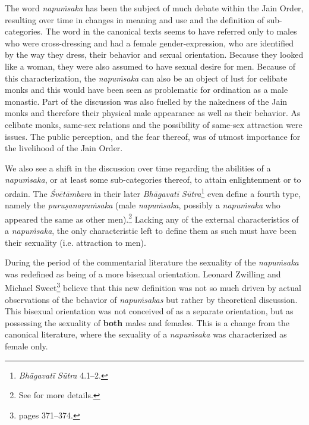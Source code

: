 The word \textit{napuṁsaka} has been the subject of much debate within the Jain Order, resulting over time in changes in meaning and use and the definition of sub-categories. The word in the canonical texts seems to have referred only to males who were cross-dressing and had a female gender-expression, who are identified by the way they dress, their behavior and sexual orientation. Because they looked like a woman, they were also assumed to have sexual desire for men. Because of this characterization, the \textit{napuṁsaka} can also be an object of lust for celibate monks and this would have been seen as problematic for ordination as a male monastic. Part of the discussion was also fuelled by the nakedness of the Jain monks and therefore their physical male appearance as well as their behavior. As celibate monks, same-sex relations and the possibility of same-sex attraction were issues. The public perception, and the fear thereof, was of utmost importance for the livelihood of the Jain Order. 

We also see a shift in the discussion over time regarding the abilities of a \textit{napuṁsaka}, or at least some sub-categories thereof, to attain enlightenment or to ordain. The \textit{Śvētāmbara} in their later \textit{Bhāgavatī Sūtra}\footnote{\textit{Bhāgavatī Sūtra} 4.1–2.} even define a fourth type, namely the \textit{puruṣanapuṁsaka} (male \textit{napuṁsaka}, possibly a \textit{napuṁsaka} who appeared the same as other men).\footnote{See \cite{zwilling} for more details.} Lacking any of the external characteristics of a \textit{napuṁsaka}, the only characteristic left to define them as such must have been their sexuality (i.e. attraction to men).

During the period of the commentarial literature the sexuality of the \textit{napuṁsaka} was redefined as being of a more bisexual orientation. Leonard Zwilling and Michael Sweet\footnote{\cite{zwilling} pages 371–374.} believe that this new definition was not so much driven by actual observations of the behavior of \textit{napuṁsakas} but rather by theoretical discussion. This bisexual orientation was not conceived of as a separate orientation, but as possessing the sexuality of \textbf{both} males and females. This is a change from the canonical literature, where the sexuality of a \textit{napuṁsaka} was characterized as female only.

